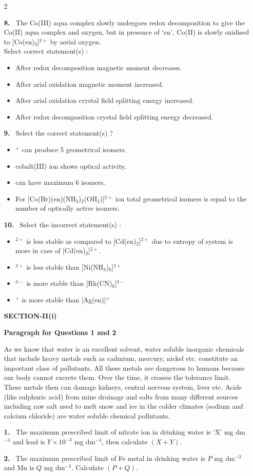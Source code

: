 \documentclass[10pt]{extarticle}
\newcommand{\sect}[1]{\par\smallskip\noindent\textbf{#1}\par}
\newcommand{\qn}[1]{\par\smallskip\noindent\textbf{#1.}~}
\newcommand{\paraq}[2]{\par\smallskip\noindent\textbf{Paragraph for Questions #1 and #2}\par}
\newenvironment{qoptions}{\begin{itemize}[leftmargin=1.8em,itemsep=1pt,topsep=2pt,label={}]}{\end{itemize}}
\newcommand{\opt}[2]{\item[(#1)] #2}
\begin{document}
\begin{multicols}{2}
\qn{8} The Co(III) aqua complex slowly undergoes redox decomposition to give the Co(II) aqua complex and oxygen, but in presence of `en', Co(II) is slowly oxidised to [Co(en)$_3$]$^{3+}$ by aerial oxygen.\\
Select correct statement(s) :
\begin{qoptions}
\opt{A}{After redox decomposition magnetic moment decreases.}
\opt{B}{After arial oxidation magnetic moment increased.}
\opt{C}{After arial oxidation crystal field splitting energy increased.}
\opt{D}{After redox decomposition crystal field splitting energy decreased.}
\end{qoptions}
\qn{9} Select the correct statement(s) ?
\begin{qoptions}
\opt{A}{[Co(gly)$_2$(OH$_2$)$_2$]$^+$ can produce 5 geometrical isomers.}
\opt{B}{[Tris(tetramine-$\mu$-\allowbreak dihydroxido\allowbreak cobalt(III))]\allowbreak cobalt(III) ion shows optical activity.}
\opt{C}{[PtCl$_2$(NH$_3$)$_2$(NO$_2$)$_2$] can have maximum 6 isomers.}
\opt{D}{For [Co(Br)(en)(NH$_3$)$_2$(OH$_2$)]$^{2+}$ ion total geometrical isomers is equal to the number of optically active isomers.}
\end{qoptions}
\qn{10} Select the incorrect statement(s) :
\begin{qoptions}
\opt{A}{[Cd(CH$_3$NH$_2$)$_4$]$^{2+}$ is less stable as compared to [Cd(en)$_2$]$^{2+}$ due to entropy of system is more in case of [Cd(en)$_2$]$^{2+}$.}
\opt{B}{[Ni(en)$_3$]$^{2+}$ is less stable than [Ni(NH$_3$)$_6$]$^{2+}$}
\opt{C}{[Co(CN)$_6$]$^{3-}$ is more stable than [Rh(CN)$_6$]$^{3-}$}
\opt{D}{[Ag(NH$_3$)$_2$]$^+$ is more stable than [Ag(en)]$^+$}
\end{qoptions}
\sect{SECTION-II(i)}
\paraq{1}{2}
As we know that water is an excellent solvent, water soluble inorganic chemicals that include heavy metals such as cadmium, mercury, nickel etc. constitute an important class of pollutants. All these metals are dangerous to humans because our body cannot excrete them. Over the time, it crosses the tolerance limit. These metals then can damage kidneys, central nervous system, liver etc. Acids (like sulphuric acid) from mine drainage and salts from many different sources including raw salt used to melt snow and ice in the colder climates (sodium and calcium chloride) are water soluble chemical pollutants.
\qn{1} The maximum prescribed limit of nitrate ion in drinking water is `X' mg dm$^{-3}$ and lead is $Y\times10^{-3}$ mg dm$^{-3}$, then calculate $(X+Y)$.
\qn{2} The maximum prescribed limit of Fe metal in drinking water is $P$ mg dm$^{-3}$ and Mn is $Q$ mg dm$^{-3}$. Calculate $(P+Q)$.

\end{multicols}
\end{document}
